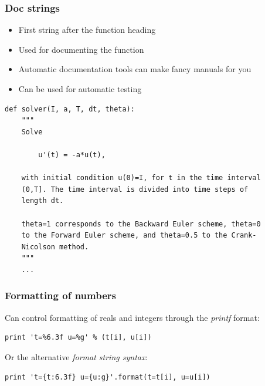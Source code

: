\documentclass{beamer}
\begin{document}
\begin{frame}
\frametitle{Doc strings}

\begin{itemize}
 \item First string after the function heading

 \item Used for documenting the function

 \item Automatic documentation tools can make fancy manuals for you

 \item Can be used for automatic testing
\end{itemize}

\noindent
\begin{verbatim}
def solver(I, a, T, dt, theta):
    """
    Solve

        u'(t) = -a*u(t),

    with initial condition u(0)=I, for t in the time interval
    (0,T]. The time interval is divided into time steps of
    length dt.

    theta=1 corresponds to the Backward Euler scheme, theta=0
    to the Forward Euler scheme, and theta=0.5 to the Crank-
    Nicolson method.
    """
    ...
\end{verbatim}
\end{frame}

\begin{frame}
\frametitle{Formatting of numbers}

Can control formatting of reals and integers through the \emph{printf} format:

\begin{verbatim}
print 't=%6.3f u=%g' % (t[i], u[i])
\end{verbatim}

Or the alternative \emph{format string syntax}:
\begin{verbatim}
print 't={t:6.3f} u={u:g}'.format(t=t[i], u=u[i])
\end{verbatim}
\end{frame}
\end{document}
